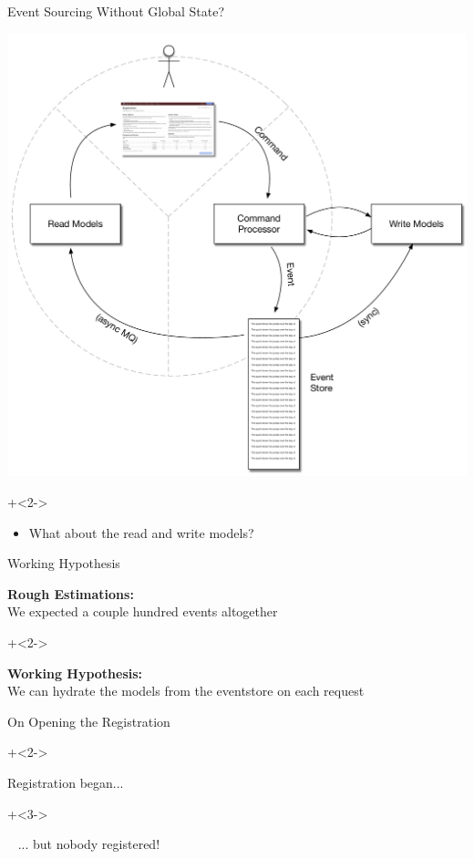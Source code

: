 \begin{frame}[fragile]{Event Sourcing Without Global State?}

\includegraphics[width=.5\textwidth]{../EventSourcing4.pdf}

\onslide+<2->

\begin{itemize}
\item What about the read and write models?
\end{itemize}

\end{frame}

\begin{frame}[fragile]{Working Hypothesis}

\textbf{Rough Estimations:} \\[.7em]
We expected a couple hundred events altogether

\onslide+<2->
\vspace{5em}

\textbf{Working Hypothesis:} \\[.7em]
We can hydrate the models from the eventstore on each request

\end{frame}


\begin{frame}[fragile]{On Opening the Registration}

\onslide+<2->

Registration began...

\onslide+<3->

\vspace{3em}

~ \hspace{10em} ... but nobody registered!
 
\end{frame}


